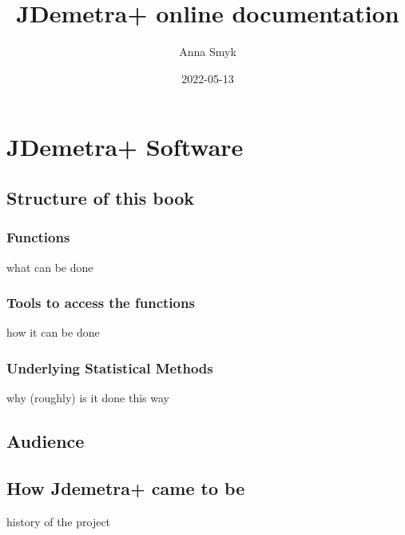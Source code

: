 \documentclass[
]{book}
\title{JDemetra+ online documentation}
\author{Anna Smyk}
\date{2022-05-13}
\begin{document}
\maketitle

{
\setcounter{tocdepth}{1}
\tableofcontents
}
\hypertarget{jdemetra-software}{%
\chapter{JDemetra+ Software}\label{jdemetra-software}}

\hypertarget{structure-of-this-book}{%
\section{Structure of this book}\label{structure-of-this-book}}

\hypertarget{functions}{%
\subsection{Functions}\label{functions}}

what can be done

\hypertarget{tools-to-access-the-functions}{%
\subsection{Tools to access the functions}\label{tools-to-access-the-functions}}

how it can be done

\hypertarget{underlying-statistical-methods}{%
\subsection{Underlying Statistical Methods}\label{underlying-statistical-methods}}

why (roughly) is it done this way

\hypertarget{audience}{%
\section{Audience}\label{audience}}

\hypertarget{how-jdemetra-came-to-be}{%
\section{How Jdemetra+ came to be}\label{how-jdemetra-came-to-be}}

history of the project
\end{document}
